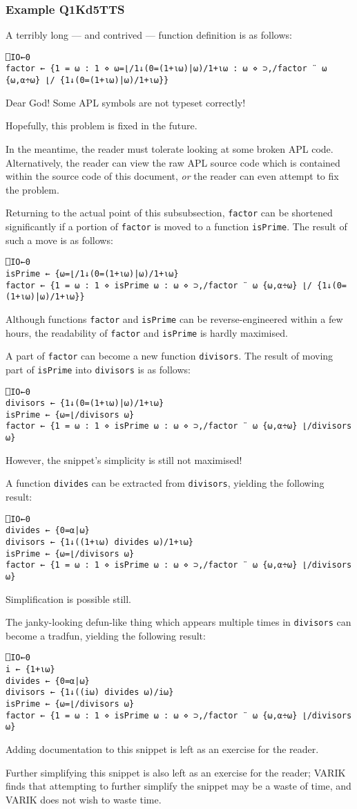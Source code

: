 \documentclass{report}
\begin{document}
\subsubsection{Example Q1Kd5TTS}
A terribly long --- and contrived --- function definition is as follows:
\begin{lstlisting}
⎕IO←0
factor ← {1 = ⍵ : 1 ⋄ ⍵=⌊/1↓(0=(1+⍳⍵)|⍵)/1+⍳⍵ : ⍵ ⋄ ⊃,/factor ¨ ⍵ {⍵,⍺÷⍵} ⌊/ {1↓(0=(1+⍳⍵)|⍵)/1+⍳⍵}}
\end{lstlisting}
Dear God!  Some APL symbols are not typeset correctly!

Hopefully, this problem is fixed in the future.

In the meantime, the reader must tolerate looking at some broken APL code.  Alternatively, the reader can view the raw APL source code which is contained within the source code of this document, \textit{or} the reader can even attempt to fix the problem.

Returning to the actual point of this subsubsection, \texttt{factor} can be shortened significantly if a portion of \texttt{factor} is moved to a function \texttt{isPrime}.  The result of such a move is as follows:
\begin{lstlisting}
⎕IO←0
isPrime ← {⍵=⌊/1↓(0=(1+⍳⍵)|⍵)/1+⍳⍵}
factor ← {1 = ⍵ : 1 ⋄ isPrime ⍵ : ⍵ ⋄ ⊃,/factor ¨ ⍵ {⍵,⍺÷⍵} ⌊/ {1↓(0=(1+⍳⍵)|⍵)/1+⍳⍵}}
\end{lstlisting}
Although functions \texttt{factor} and \texttt{isPrime} can be reverse-engineered within a few hours, the readability of \texttt{factor} and \texttt{isPrime} is hardly maximised.

A part of \texttt{factor} can become a new function \texttt{divisors}.  The result of moving part of \texttt{isPrime} into \texttt{divisors} is as follows:
\begin{lstlisting}
⎕IO←0
divisors ← {1↓(0=(1+⍳⍵)|⍵)/1+⍳⍵}
isPrime ← {⍵=⌊/divisors ⍵}
factor ← {1 = ⍵ : 1 ⋄ isPrime ⍵ : ⍵ ⋄ ⊃,/factor ¨ ⍵ {⍵,⍺÷⍵} ⌊/divisors ⍵}
\end{lstlisting}
However, the snippet's simplicity is still not maximised!

A function \texttt{divides} can be extracted from \texttt{divisors}, yielding the following result:
\begin{lstlisting}
⎕IO←0
divides ← {0=⍺|⍵}
divisors ← {1↓((1+⍳⍵) divides ⍵)/1+⍳⍵}
isPrime ← {⍵=⌊/divisors ⍵}
factor ← {1 = ⍵ : 1 ⋄ isPrime ⍵ : ⍵ ⋄ ⊃,/factor ¨ ⍵ {⍵,⍺÷⍵} ⌊/divisors ⍵}
\end{lstlisting}
Simplification is possible still.

The janky-looking defun-like thing which appears multiple times in \texttt{divisors} can become a tradfun, yielding the following result:
\begin{lstlisting}
⎕IO←0
i ← {1+⍳⍵}
divides ← {0=⍺|⍵}
divisors ← {1↓((i⍵) divides ⍵)/i⍵}
isPrime ← {⍵=⌊/divisors ⍵}
factor ← {1 = ⍵ : 1 ⋄ isPrime ⍵ : ⍵ ⋄ ⊃,/factor ¨ ⍵ {⍵,⍺÷⍵} ⌊/divisors ⍵}
\end{lstlisting}
Adding documentation to this snippet is left as an exercise for the reader.

Further simplifying this snippet is also left as an exercise for the reader; VARIK finds that attempting to further simplify the snippet may be a waste of time, and VARIK does not wish to waste time.
\end{document}
